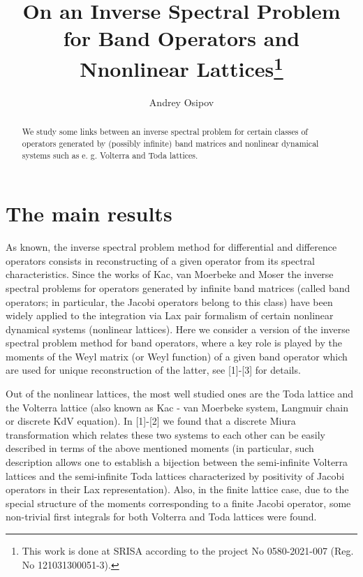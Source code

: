 \documentclass[12pt]{llncs}
\begin{document}
%
\fi

\title{On an Inverse Spectral Problem for Band Operators and Nnonlinear Lattices\thanks{This work is done at SRISA according to the project No
0580-2021-007 (Reg. No 121031300051-3).}}
\author{Andrey Osipov 
}

\maketitle

\begin{abstract}
We study some links between an inverse spectral problem for
certain classes of operators generated by (possibly infinite) band
matrices and nonlinear dynamical systems such as e. g. Volterra
and Toda lattices. 
\end{abstract}

\section{The main results}
As known, the inverse spectral problem method for differential and
difference operators consists in reconstructing of a given
operator from its spectral characteristics. Since the works of
Kac, van Moerbeke and Moser the inverse spectral problems for
operators generated by infinite band matrices (called band
operators; in particular, the Jacobi operators belong to this
class) have been widely applied to the integration via Lax pair
formalism of certain nonlinear dynamical systems (nonlinear
lattices). Here we consider a version of the inverse spectral
problem method for band operators, where a key role is played by
the moments of the Weyl matrix (or Weyl function) of a given band
operator which are used for unique reconstruction of the latter,
see [1]-[3] for details.

Out of the nonlinear lattices, the most well studied ones are the
Toda lattice and the Volterra lattice (also known as Kac - van
Moerbeke system, Langmuir chain or discrete KdV equation). In
[1]-[2] we found that a discrete Miura transformation which
relates these two systems to each other can be easily described in
terms of the above mentioned moments (in particular, such
description allows one to establish a bijection between the
semi-infinite Volterra lattices and the semi-infinite Toda
lattices characterized by positivity of Jacobi operators in their
Lax representation). Also, in the finite lattice case, due to the
special structure of the moments corresponding to a finite Jacobi
operator, some non-trivial first integrals for both Volterra and
Toda lattices were found.
\end{document}
